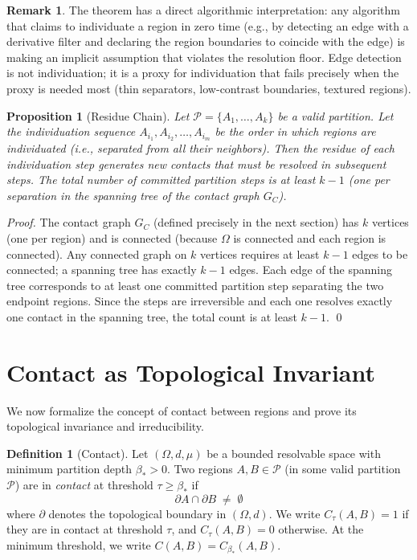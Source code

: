 \documentclass[twocolumn]{article}
\theoremstyle{plain}
\newtheorem{proposition}[theorem]{Proposition}
\theoremstyle{definition}
\newtheorem{definition}[theorem]{Definition}
\newtheorem{remark}[theorem]{Remark}
\newcommand{\PP}{\mathcal{P}}
\newcommand{\GC}{G_C}
\newcommand{\bstar}{\beta_*}
\begin{document}
\begin{remark}
The theorem has a direct algorithmic interpretation: any algorithm that claims
to individuate a region in zero time (e.g., by detecting an edge with a
derivative filter and declaring the region boundaries to coincide with the edge)
is making an implicit assumption that violates the resolution floor. Edge
detection is not individuation; it is a proxy for individuation that fails
precisely when the proxy is needed most (thin separators, low-contrast
boundaries, textured regions).
\end{remark}

\begin{proposition}[Residue Chain]
\label{prop:residuechain}
Let $\PP = \{A_1, \ldots, A_k\}$ be a valid partition. Let the individuation
sequence $A_{i_1}, A_{i_2}, \ldots, A_{i_m}$ be the order in which regions are
individuated (i.e., separated from all their neighbors). Then the residue of each
individuation step generates new contacts that must be resolved in subsequent
steps. The total number of committed partition steps is at least $k-1$ (one per
separation in the spanning tree of the contact graph $\GC$).
\end{proposition}

\begin{proof}
The contact graph $\GC$ (defined precisely in the next section) has $k$ vertices
(one per region) and is connected (because $\Omega$ is connected and each region
is connected). Any connected graph on $k$ vertices requires at least $k-1$ edges
to be connected; a spanning tree has exactly $k-1$ edges. Each edge of the
spanning tree corresponds to at least one committed partition step separating
the two endpoint regions. Since the steps are irreversible and each one resolves
exactly one contact in the spanning tree, the total count is at least $k-1$. \qed
\end{proof}

\section{Contact as Topological Invariant}
\label{sec:contact}

We now formalize the concept of contact between regions and prove its topological
invariance and irreducibility.

\begin{definition}[Contact]
\label{def:contact}
Let $(\Omega, d, \mu)$ be a bounded resolvable space with minimum partition depth
$\bstar > 0$. Two regions $A, B \in \PP$ (in some valid partition $\PP$) are in
\emph{contact} at threshold $\tau \geq \bstar$ if
\[
  \partial A \cap \partial B \;\neq\; \emptyset
\]
where $\partial$ denotes the topological boundary in $(\Omega, d)$. We write
$C_\tau(A,B) = 1$ if they are in contact at threshold $\tau$, and $C_\tau(A,B) = 0$
otherwise. At the minimum threshold, we write $C(A,B) = C_{\bstar}(A,B)$.
\end{definition}
\end{document}

